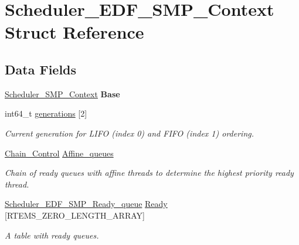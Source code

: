 \hypertarget{structScheduler__EDF__SMP__Context}{}\section{Scheduler\+\_\+\+E\+D\+F\+\_\+\+S\+M\+P\+\_\+\+Context Struct Reference}
\label{structScheduler__EDF__SMP__Context}
\subsection*{Data Fields}
\begin{DoxyCompactItemize}
\item 
\mbox{\label{structScheduler__EDF__SMP__Context_aa4e814d9dd8bb9bd5b66d74958d7c11c}} 
\mbox{\hyperlink{structScheduler__SMP__Context}{Scheduler\+\_\+\+S\+M\+P\+\_\+\+Context}} {\bfseries Base}
\item 
\mbox{\label{structScheduler__EDF__SMP__Context_acf8dd8b9d98df4e9f4c4d8744ca19ab0}} 
int64\+\_\+t \mbox{\hyperlink{structScheduler__EDF__SMP__Context_acf8dd8b9d98df4e9f4c4d8744ca19ab0}{generations}} \mbox{[}2\mbox{]}
\begin{DoxyCompactList}\small\item\em Current generation for L\+I\+FO (index 0) and F\+I\+FO (index 1) ordering. \end{DoxyCompactList}\item 
\mbox{\label{structScheduler__EDF__SMP__Context_a68b71a18ee49bb8f53baf28aa1120d77}} 
\mbox{\hyperlink{unionChain__Control}{Chain\+\_\+\+Control}} \mbox{\hyperlink{structScheduler__EDF__SMP__Context_a68b71a18ee49bb8f53baf28aa1120d77}{Affine\+\_\+queues}}
\begin{DoxyCompactList}\small\item\em Chain of ready queues with affine threads to determine the highest priority ready thread. \end{DoxyCompactList}\item 
\mbox{\hyperlink{structScheduler__EDF__SMP__Ready__queue}{Scheduler\+\_\+\+E\+D\+F\+\_\+\+S\+M\+P\+\_\+\+Ready\+\_\+queue}} \mbox{\hyperlink{structScheduler__EDF__SMP__Context_a553f8fcbd76b9c1d61ffb72fc15a4a9e}{Ready}} \mbox{[}R\+T\+E\+M\+S\+\_\+\+Z\+E\+R\+O\+\_\+\+L\+E\+N\+G\+T\+H\+\_\+\+A\+R\+R\+AY\mbox{]}
\begin{DoxyCompactList}\small\item\em A table with ready queues. \end{DoxyCompactList}\end{DoxyCompactItemize}


